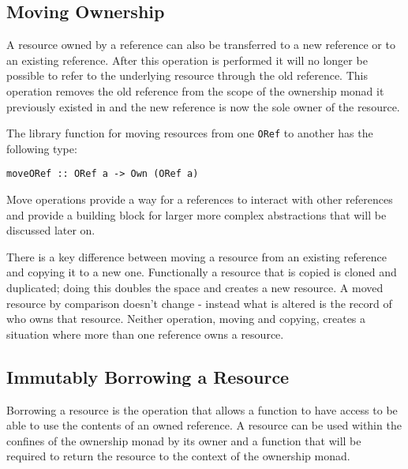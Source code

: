 \documentclass[onehalf,11pt]{beavtex}
\begin{document}
\subsection{Moving Ownership}

A resource owned by a reference can also be transferred to a new reference or
to an existing reference. After this operation is performed it will no longer
be possible to refer to the underlying resource through the old reference. This
operation removes the old reference from the scope of the ownership monad it
previously existed in and the new reference is now the sole owner of the
resource.

The library function for moving resources from one \texttt{ORef} to another has
the following type:

\begin{verbatim}
moveORef :: ORef a -> Own (ORef a)
\end{verbatim}

Move operations provide a way for a references to interact with
other references and provide a building block for larger more complex
abstractions that will be discussed later on.

There is a key difference between moving a resource from an existing reference
and copying it to a new one.  Functionally a resource that is copied is cloned
and duplicated; doing this doubles the space and creates a new resource.
A moved resource by comparison doesn't change - instead what is altered is the
record of who owns that resource.  Neither operation, moving and copying,
creates a situation where more than one reference owns a resource.

\subsection{Immutably Borrowing a Resource}

Borrowing a resource is the operation that allows a function to have
access to be able to use the contents of an owned reference.
A resource can be used within the confines of the ownership monad by its owner
and a function that will be required to return the resource to the context of
the ownership monad.
\end{document}
